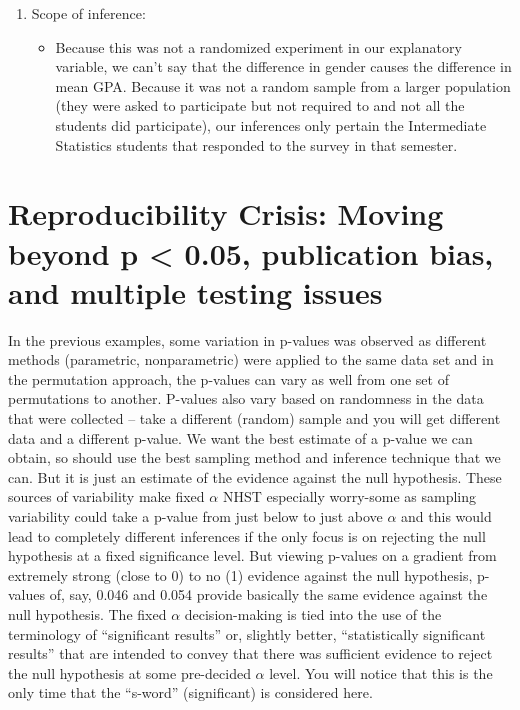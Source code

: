 \documentclass[
]{book}
\providecommand{\tightlist}{%
  \setlength{\itemsep}{0pt}\setlength{\parskip}{0pt}}
\begin{document}
\begin{enumerate}
\def\labelenumi{\arabic{enumi}.}
\setcounter{enumi}{5}
\item
  Scope of inference: 

  \begin{itemize}
  \tightlist
  \item
    Because this was not a randomized experiment  in our explanatory variable, we can't say that the
    difference in gender causes the difference in mean GPA. Because it was
    not a random sample from a larger population (they were asked to participate but not required to and not all the students did participate), our inferences only pertain
    the Intermediate Statistics students that responded to the survey in that semester. 
  \end{itemize}
\end{enumerate}

\newpage

\hypertarget{section2-8}{%
\section{Reproducibility Crisis: Moving beyond p \textless{} 0.05, publication bias, and multiple testing issues}\label{section2-8}}

In the previous examples, some variation in p-values was observed as different methods (parametric, nonparametric) were applied to the same data set and in the permutation approach, the p-values can vary as well from one set of permutations to another. P-values also vary based on randomness in the data that were collected -- take a different (random) sample and you will get different data and a different p-value. We want the best estimate of a p-value we can obtain, so should use the best sampling method and inference technique that we can. But it is just an estimate of the evidence against the null hypothesis. These sources of variability make fixed \(\alpha\) NHST especially worry-some as sampling variability could take a p-value from just below to just above \(\alpha\) and this would lead to completely different inferences if the only focus is on rejecting the null hypothesis at a fixed significance level. But viewing p-values on a gradient from extremely strong (close to 0) to no (1) evidence against the null hypothesis, p-values of, say, 0.046 and 0.054 provide basically the same evidence against the null hypothesis. The fixed \(\alpha\) decision-making is tied into the use of the terminology of ``significant results'' or, slightly better, ``statistically significant results''  that are intended to convey that there was sufficient evidence to reject the null hypothesis at some pre-decided \(\alpha\) level. You will notice that this is the only time that the ``s-word'' (significant) is considered here.
\end{document}
